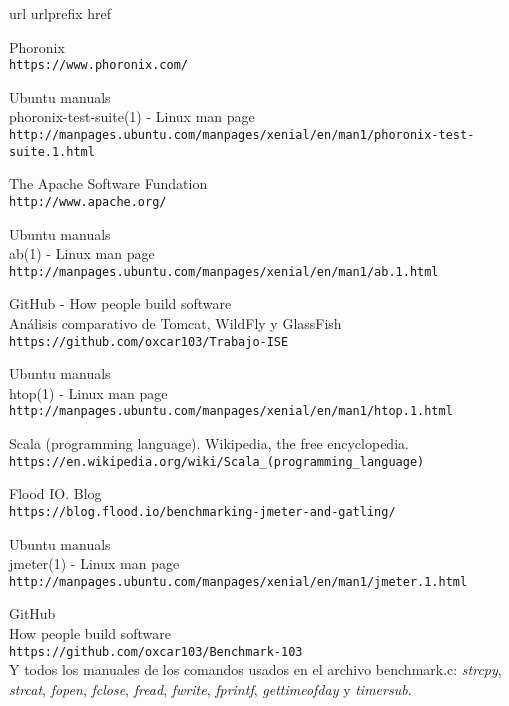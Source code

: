 \begin{thebibliography}{10}
\expandafter\ifx\csname url\endcsname\relax
  \def\url#1{\texttt{#1}}\fi
\expandafter\ifx\csname urlprefix\endcsname\relax\def\urlprefix{URL }\fi
\expandafter\ifx\csname href\endcsname\relax
  \def\href#1#2{#2} \def\path#1{#1}\fi

Phoronix\\
  \url{https://www.phoronix.com/}

Ubuntu manuals\\
phoronix-test-suite(1) - Linux man page\\
  \url{http://manpages.ubuntu.com/manpages/xenial/en/man1/phoronix-test-suite.1.html}

The Apache Software Fundation\\
  \url{http://www.apache.org/}

Ubuntu manuals\\
ab(1) - Linux man page\\
  \url{http://manpages.ubuntu.com/manpages/xenial/en/man1/ab.1.html}

GitHub - How people build software\\
Análisis comparativo de Tomcat, WildFly y GlassFish\\
  \url{https://github.com/oxcar103/Trabajo-ISE}

Ubuntu manuals\\
htop(1) - Linux man page\\
  \url{http://manpages.ubuntu.com/manpages/xenial/en/man1/htop.1.html}

Scala (programming language). Wikipedia, the free encyclopedia.\\
  \url{https://en.wikipedia.org/wiki/Scala_(programming_language)}

Flood IO. Blog\\
  \url{https://blog.flood.io/benchmarking-jmeter-and-gatling/}

Ubuntu manuals\\
jmeter(1) - Linux man page\\
  \url{http://manpages.ubuntu.com/manpages/xenial/en/man1/jmeter.1.html}

GitHub\\
How people build software\\
  \url{https://github.com/oxcar103/Benchmark-103}\\
Y todos los manuales de los comandos usados en el archivo benchmark.c: \textit{strcpy}\cite{man_strcpy},
\textit{strcat}\cite{man_strcat}, \textit{fopen}\cite{man_fopen}, \textit{fclose}\cite{man_fclose},
\textit{fread}\cite{man_fread}, \textit{fwrite}\cite{man_fwrite}, \textit{fprintf}\cite{fprintf},
\textit{gettimeofday}\cite{man_gettimeofday} y \textit{timersub}\cite{man_timersub}.


\end{thebibliography}
